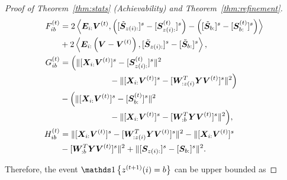 \documentclass[journal]{IEEEtran}
\theoremstyle{definition}
\theoremstyle{definition}
\newcommand{\of}[1]{\left(#1\right)}
\newcommand{\offf}[1]{\left\{#1\right\}}
\newcommand{\ang}[1]{\left\langle#1\right\rangle}
\begin{document}
\begin{proof}[Proof of Theorem~\ref{thm:stats} (Achievability) and Theorem~\ref{thm:refinement}]
    \vspace{-0.5cm}
    \small
    \begin{align}
        F_{ib}^{(t)} &= 2 \ang{\mE_{i:} \mV^{(t)}, \of{ [  \tilde \mS_{z(i):} ]^s  -  [  \mS_{z(i):}^{(t)} ]^s  }  - \of{  [  \tilde \mS_{b:} ]^s  -  [  \mS_{b:}^{(t)} ]^s  }  }  \\
        & + 2 \ang{ \mE_{i:} \of{ \mV - \mV^{(t)} }, [  \tilde \mS_{z(i):} ]^s - [  \tilde \mS_{b:} ]^s  }, \label{eq:f}\\
        G_{ib}^{(t)} &=   \Big( \onormSize{}{ [\mX_{i:} \mV^{(t)}]^s -  [  \mS_{z(i):}^{(t)}  ]^s}^2 \\
        & \quad \quad \quad \quad \quad \quad -  \onormSize{}{ [\mX_{i:} \mV^{(t)}]^s -  [  \mW_{:z(i)}^T \mY \mV^{(t)} ]^s}^2\Big)   \\
        & -   \Big( \onormSize{}{ [\mX_{i:} \mV^{(t)}]^s -  [  \mS_{b:}^{(t)}  ]^s}^2 \\
        & \quad \quad \quad \quad \quad \quad   -  \onormSize{}{ [\mX_{i:} \mV^{(t)}]^s -  [  \mW_{:b}^T \mY \mV^{(t)} ]^s}^2 \Big), \label{eq:g} \\
        H_{ib}^{(t)} &=   \onormSize{}{ [\mX_{i:} \mV^{(t)}]^s -  [  \mW_{:z(i)}^T \mY \mV^{(t)} ]^s}^2 - \onormSize{}{ [\mX_{i:} \mV^{(t)}]^s \\
        & -  [  \mW_{:b}^T \mY \mV^{(t)} ]^s}^2  + \onormSize{}{ [ \mS_{z(i):}  ]^s - [ \mS_{b:}  ]^s  }^2 . \label{eq:h}
    \end{align}
    \normalsize

   Therefore, the event $ \ind \offf{ z^{(t+1)}(i) = b }$ can be upper bounded as


\end{proof}
\end{document}
